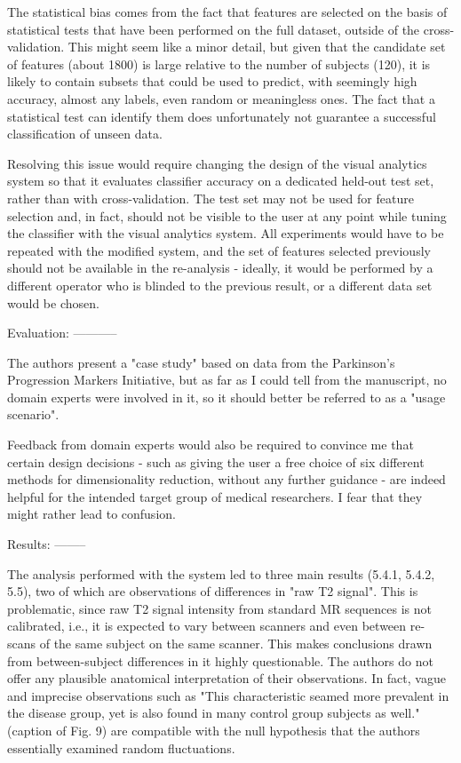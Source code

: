     The statistical bias comes from the fact that features are selected on the basis
    of statistical tests that have been performed on the full dataset, outside of the
    cross-validation. This might seem like a minor detail, but given that the
    candidate set of features (about 1800) is large relative to the number of subjects
    (120), it is likely to contain subsets that could be used to predict, with
    seemingly high accuracy, almost any labels, even random or meaningless ones. The
    fact that a statistical test can identify them does unfortunately not guarantee a
    successful classification of unseen data.

    Resolving this issue would require changing the design of the visual analytics
    system so that it evaluates classifier accuracy on a dedicated held-out test set,
    rather than with cross-validation. The test set may not be used for feature
    selection and, in fact, should not be visible to the user at any point while
    tuning the classifier with the visual analytics system. All experiments would have
    to be repeated with the modified system, and the set of features selected
    previously should not be available in the re-analysis - ideally, it would be
    performed by a different operator who is blinded to the previous result, or a
    different data set would be chosen.

    Evaluation:
    -----------

    The authors present a "case study" based on data from the Parkinson's Progression
    Markers Initiative, but as far as I could tell from the manuscript, no domain
    experts were involved in it, so it should better be referred to as a "usage
    scenario".

    Feedback from domain experts would also be required to convince me that certain
    design decisions - such as giving the user a free choice of six different methods
    for dimensionality reduction, without any further guidance - are indeed helpful
    for the intended target group of medical researchers. I fear that they might
    rather lead to confusion.

    Results:
    --------

    The analysis performed with the system led to three main results (5.4.1, 5.4.2,
    5.5), two of which are observations of differences in "raw T2 signal". This is
    problematic, since raw T2 signal intensity from standard MR sequences is not
    calibrated, i.e., it is expected to vary between scanners and even between re-
    scans of the same subject on the same scanner. This makes conclusions drawn from
    between-subject differences in it highly questionable. The authors do not offer
    any plausible anatomical interpretation of their observations. In fact, vague and
    imprecise observations such as "This characteristic seamed more prevalent in the
    disease group, yet is also found in many control group subjects as well." (caption
    of Fig. 9) are compatible with the null hypothesis that the authors essentially
    examined random fluctuations.

